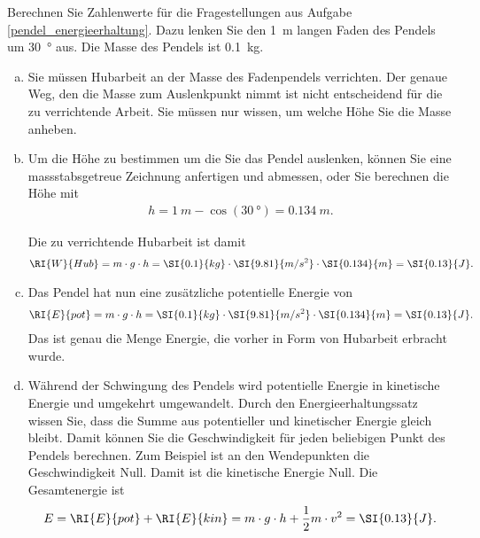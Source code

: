 \begin{aufgabe}
	Berechnen Sie Zahlenwerte für die Fragestellungen aus Aufgabe \ref{pendel_energieerhaltung}.
	Dazu lenken Sie den \SI{1}{m} langen Faden des Pendels um \SI{30}{\degree} aus.
	Die Masse des Pendels ist \SI{0.1}{kg}.


	\begin{loesung}
		\begin{enumerate}[a)]
			\item Sie müssen Hubarbeit an der Masse des Fadenpendels verrichten. 
				Der genaue Weg, den die Masse zum Auslenkpunkt nimmt ist nicht entscheidend für die zu verrichtende Arbeit.
				Sie müssen nur wissen, um welche Höhe Sie die Masse anheben.
			\item Um die Höhe zu bestimmen um die Sie das Pendel auslenken, können Sie eine massstabsgetreue Zeichnung anfertigen und abmessen,
				oder Sie berechnen die Höhe mit
				\begin{eqnarray*}
					h=\SI{1}{m} - \cos(\SI{30}{\degree}) = \SI{0.134}{m}\text{.}
				\end{eqnarray*}

				Die zu verrichtende Hubarbeit ist damit
				\begin{eqnarray*}
					\RI{W}{Hub} = m\cdot g\cdot h =\SI{0.1}{kg}\cdot\SI{9.81}{m/s^2}\cdot\SI{0.134}{m} =\SI{0.13}{J}\text{.}
				\end{eqnarray*}
			\item Das Pendel hat nun eine zusätzliche potentielle Energie von
				\begin{eqnarray*}
					\RI{E}{pot} = m\cdot g\cdot h =\SI{0.1}{kg}\cdot\SI{9.81}{m/s^2}\cdot\SI{0.134}{m} =\SI{0.13}{J}\text{.}
				\end{eqnarray*}
				Das ist genau die Menge Energie, die vorher in Form von Hubarbeit erbracht wurde.
			\item Während der Schwingung des Pendels wird potentielle Energie in kinetische Energie und umgekehrt umgewandelt.
				Durch den Energieerhaltungssatz wissen Sie, dass die Summe aus potentieller und kinetischer Energie gleich
				bleibt. Damit können Sie die Geschwindigkeit für jeden beliebigen Punkt des Pendels berechnen.
				Zum Beispiel ist an den Wendepunkten die Geschwindigkeit Null. Damit ist die kinetische Energie Null. Die Gesamtenergie ist
				\begin{eqnarray*}
					E =\RI{E}{pot} + \RI{E}{kin} = m\cdot g\cdot h + \frac{1}{2} m\cdot v^2 = \SI{0.13}{J}\text{.} 
				\end{eqnarray*}


\end{enumerate}
\end{loesung}
\end{aufgabe}
